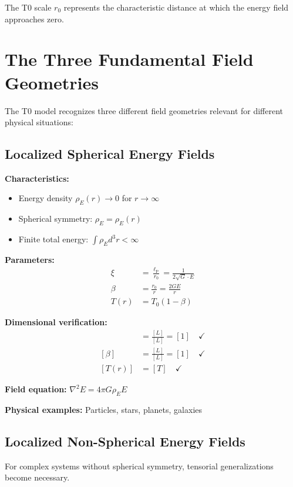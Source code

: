\documentclass[12pt,a4paper]{report}
\newcommand{\lP}{\ell_{\text{P}}}         %
\newcommand{\rzero}{r_0}                  %
\begin{document}
The T0 scale $\rzero$ represents the characteristic distance at which the energy field approaches zero.

\section{The Three Fundamental Field Geometries}
\label{sec:three_field_geometries}

The T0 model recognizes three different field geometries relevant for different physical situations:

\subsection{Localized Spherical Energy Fields}
\label{subsec:localized_spherical}

\textbf{Characteristics:}
\begin{itemize}
	\item Energy density $\rho_E(r) \to 0$ for $r \to \infty$
	\item Spherical symmetry: $\rho_E = \rho_E(r)$
	\item Finite total energy: $\int \rho_E d^3r < \infty$
\end{itemize}

\textbf{Parameters:}
\begin{align}
	\xi &= \frac{\lP}{\rzero} = \frac{1}{2\sqrt{G} \cdot E} \\
	\beta &= \frac{\rzero}{r} = \frac{2GE}{r} \\
	T(r) &= T_0(1 - \beta)
\end{align}

\textbf{Dimensional verification:}
\begin{align}
	[\xi] &= \frac{[L]}{[L]} = [1] \quad \checkmark \\
	[\beta] &= \frac{[L]}{[L]} = [1] \quad \checkmark \\
	[T(r)] &= [T] \quad \checkmark
\end{align}

\textbf{Field equation:} $\nabla^2 E = 4\pi G \rho_E E$

\textbf{Physical examples:} Particles, stars, planets, galaxies

\subsection{Localized Non-Spherical Energy Fields}
\label{subsec:localized_nonsphere}

For complex systems without spherical symmetry, tensorial generalizations become necessary.
\end{document}
